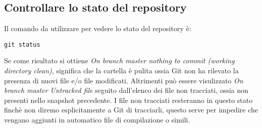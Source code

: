 \subsection{Controllare lo stato del repository}
Il comando da utilizzare per vedere lo stato del repository è:

\begin{center}
\texttt{git status}
\end{center}

Se come risultato si ottiene \textit{On branch master nothing to commit (working directory clean)}, significa che la cartella è pulita ossia Git non ha rilevato la presenza di nuovi file e/o file modificati. Altrimenti può essere visulizzato \textit{On branch master Untracked file} seguito dall'elenco dei file non tracciati, ossia non presenti nello snapshot precedente. I file non tracciati resteranno in questo stato finchè non diremo esplicitamente a Git di tracciarli, questo serve per impedire che vengano aggiunti in automatico file di compilazione o simili.